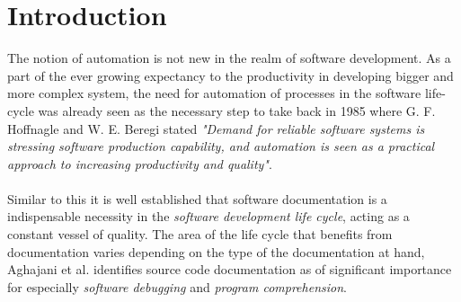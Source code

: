 \section{Introduction}
\label{sec:intro}
The notion of automation is not new in the realm of software development. As a part of the ever growing expectancy to the productivity in developing bigger and more complex system, the need for automation of processes in the software life-cycle was already seen as the necessary step to take back in 1985 where G. F. Hoffnagle and W. E. Beregi stated \textit{"Demand for reliable software systems is stressing software production capability, and automation is seen as a practical approach to increasing productivity and quality"}.
\\ \\
Similar to this it is well established that software documentation is a indispensable necessity in the \textit{software development life cycle}, acting as a constant vessel of quality. The area of the life cycle that benefits from documentation varies depending on the type of the documentation at hand, Aghajani et al.\cite{aghajani2020software} identifies source code documentation as of significant importance for especially \textit{software debugging} and \textit{program comprehension}.

